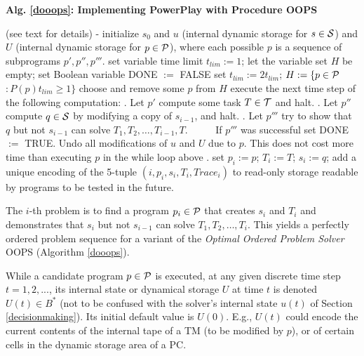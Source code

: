 \documentclass{article}
\begin{document}
\begin{algorithm}{\bf Alg. \ref{dooops}: Implementing {\sc PowerPlay} with Procedure OOPS \cite{Schmidhuber:04oops}}
\label{dooops}
\begin{algorithmic}
\STATE (see text for details) - initialize $s_0$ and 
$u$ (internal dynamic storage for $s \in \cal S$) and $U$ (internal dynamic storage for $p \in \cal P$),
where each possible $p$ is a sequence  of subprograms  $p',p'',p'''$.
\STATE set variable time limit $t_{lim}:=1$; 
\STATE let the variable set $H$ be empty;
\STATE set Boolean variable DONE $:=$ FALSE
\REPEAT 
{} 
\STATE set $t_{lim} := 2 t_{lim}$; $H := \{p \in \cal P$  $: P(p)t_{lim}  \geq 1\}$
\ELSE
\STATE choose and remove some   $p$ from $H$ 
\STATE execute the next time step of the following computation:
. Let $p'$ compute some task $T \in \cal T$ and halt.
. Let $p''$ compute $q \in \cal S$ by modifying a copy of $s_{i-1}$, and halt.
. Let $p'''$ try to show that  $q$ but not $s_{i-1}$ can solve $T_1, T_2, \ldots, T_{i-1}, T$. 
\STATE \ \ \ \ \ If $p'''$ was successful set DONE $:=$ TRUE. 
\ENDWHILE
\STATE Undo all modifications of $u$ and $U$ due to $p$. This does not cost more time than executing $p$ in the while loop above \cite{Schmidhuber:04oops}.
\ENDIF
{}
\STATE set $p_i := p$; $T_i := T$; $s_i := q$;
\STATE add a unique encoding of the 5-tuple $(i, p_i, s_i, T_i, Trace_i)$ to read-only storage readable by 
programs to be tested in the future.
\ENDFOR
\end{algorithmic}
\end{algorithm}


The $i$-th problem is to find a program $p_i \in \cal P$ that creates  $s_i$ and  $T_i$ 
and demonstrates that  $s_i$ but not $s_{i-1}$ can solve $T_1, T_2, \ldots, T_i$.
This yields a perfectly ordered problem sequence for a variant of
the {\em Optimal Ordered Problem Solver}
 OOPS \cite{Schmidhuber:04oops} (Algorithm \ref{dooops}).
 
While  a candidate program $p \in \cal P$ is executed,
at any given discrete time step $t=1,2,... $,
its internal state or dynamical storage $U$ at time $t$ is denoted $U(t) \in B^*$
(not to be confused with the solver's internal state $u(t)$ of Section \ref{decisionmaking}).
Its initial default value is $U(0)$. E.g., 
$U(t)$ could encode the current contents of the internal tape of a TM (to be modified by $p$),
or of certain cells in the dynamic storage area of a PC.
 
\end{document}
